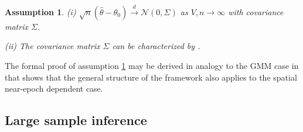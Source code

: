\documentclass[12pt]{article}
\newtheorem{assume}{Assumption}
\begin{document}
\begin{assume}
	\label{as:clt}
	(i) $\sqrt{n}(\hat{\theta} - \theta_0) \overset{d}{\to} \mathcal{N}(0,\Sigma)$ as $V,n \to \infty$ with covariance matrix ${\Sigma}$.
	
	(ii) The covariance matrix ${\Sigma}$ can be characterized by \citet[Theorem 11.2.b, Theorem H.1]{PP97}.
\end{assume}

The formal proof of assumption \ref{as:clt} may be derived in analogy to the GMM case in \cite[Theorem 4]{JP12} that shows that the general structure of the \cite{PP97} framework also applies to the spatial near-epoch dependent case.



\subsection{Large sample inference}
\label{sec:asymptotic_inference}
\end{document}
